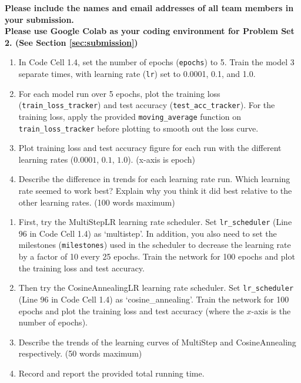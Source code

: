 \documentclass[a4 paper]{article}
\newcommand{\pya}[1]{\texttt{#1}}
\begin{document}
\textbf{Please include the names and email addresses of all team members in your submission.\\\textbf{Please use Google Colab as your coding environment for Problem Set 2. (See Section \ref{sec:submission})}}


\begin{enumerate}
    \item In Code Cell 1.4, set the number of epochs (\texttt{epochs}) to 5. Train the model 3 separate times, with learning rate (\pya{lr}) set to 0.0001, 0.1, and 1.0.
    \item For each model run over 5 epochs, plot the training loss (\pya{train_loss_tracker}) and test accuracy (\pya{test_acc_tracker}). For the training loss, apply the provided \pya{moving_average} function on \pya{train_loss_tracker} before plotting to smooth out the loss curve.
    \item Plot training loss and test accuracy figure for each run with the different learning rates ($0.0001$, $0.1$, $1.0$). (x-axis is epoch)
    \item Describe the difference in trends for each learning rate run. Which learning rate seemed to work best? Explain why you think it did best relative to the other learning rates. (100 words maximum)
\end{enumerate}

\solution{}


\begin{enumerate}
    \item First, try the MultiStepLR learning rate scheduler. Set \pya{lr_scheduler} (Line 96 in Code Cell 1.4) as `multistep'. In addition, you also need to set the milestones (\pya{milestones}) used in the scheduler to decrease the learning rate by a factor of 10 every 25 epochs. Train the network for 100 epochs and plot the training loss and test accuracy.
    \item Then try the CosineAnnealingLR learning rate scheduler. Set \pya{lr_scheduler} (Line 96 in Code Cell 1.4) as `cosine\_annealing'. Train the network for 100 epochs and plot the training loss and test accuracy (where the $x$-axis is the number of epochs).
    \item Describe the trends of the learning curves of MultiStep and CosineAnnealing respectively. (50 words maximum)
    \item Record and report the provided total running time.
\end{enumerate}
\end{document}
